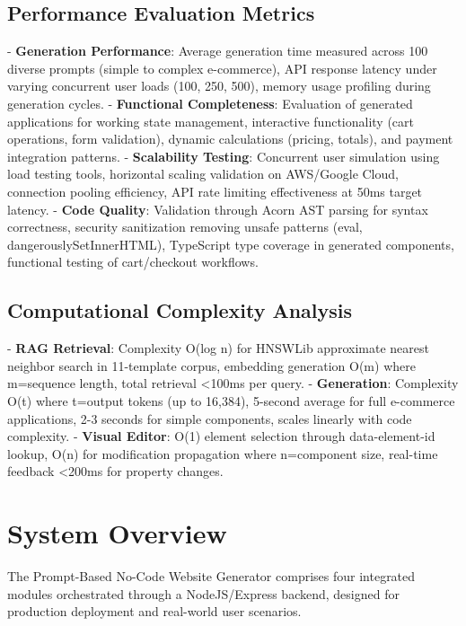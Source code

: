 \documentclass[10pt, conference, letterpaper]{IEEEtran}
\begin{document}
\subsection{Performance Evaluation Metrics}
- \textbf{Generation Performance}: Average generation time measured across 100 diverse prompts (simple to complex e-commerce), API response latency under varying concurrent user loads (100, 250, 500), memory usage profiling during generation cycles.
- \textbf{Functional Completeness}: Evaluation of generated applications for working state management, interactive functionality (cart operations, form validation), dynamic calculations (pricing, totals), and payment integration patterns.
- \textbf{Scalability Testing}: Concurrent user simulation using load testing tools, horizontal scaling validation on AWS/Google Cloud, connection pooling efficiency, API rate limiting effectiveness at 50ms target latency.
- \textbf{Code Quality}: Validation through Acorn AST parsing for syntax correctness, security sanitization removing unsafe patterns (eval, dangerouslySetInnerHTML), TypeScript type coverage in generated components, functional testing of cart/checkout workflows.

\subsection{Computational Complexity Analysis}
- \textbf{RAG Retrieval}: Complexity O(log n) for HNSWLib approximate nearest neighbor search in 11-template corpus, embedding generation O(m) where m=sequence length, total retrieval <100ms per query.
- \textbf{Generation}: Complexity O(t) where t=output tokens (up to 16,384), 5-second average for full e-commerce applications, 2-3 seconds for simple components, scales linearly with code complexity.
- \textbf{Visual Editor}: O(1) element selection through data-element-id lookup, O(n) for modification propagation where n=component size, real-time feedback <200ms for property changes.

\section{System Overview}
The Prompt-Based No-Code Website Generator comprises four integrated modules orchestrated through a NodeJS/Express backend, designed for production deployment and real-world user scenarios.
\end{document}
